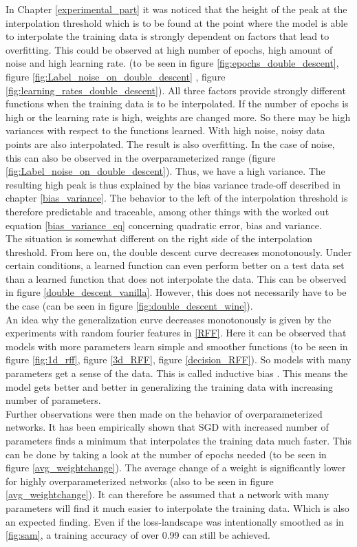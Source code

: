 In Chapter \ref{experimental_part} it was noticed that the height of the peak at the interpolation threshold which is to be found at the point where the model is able to interpolate the training data is strongly dependent on factors that lead to overfitting. This could be observed at high number of epochs, high amount of noise and high learning rate. (to be seen in figure \ref{fig:epochs_double_descent}, figure \ref{fig:Label_noise_on_double_descent} , figure \ref{fig:learning_rates_double_descent}). All three factors provide strongly different functions when the training data is to be interpolated. If the number of epochs is high or the learning rate is high, weights are changed more. So there may be high variances with respect to the functions learned. With high noise, noisy data points are also interpolated. The result is also overfitting. In the case of noise, this can also be observed in the overparameterized range (figure \ref{fig:Label_noise_on_double_descent}). Thus, we have a high variance. The resulting high peak is thus explained by the bias variance trade-off described in chapter \ref{bias_variance}. The behavior to the left of the interpolation threshold is therefore predictable and traceable, among other things with the worked out equation \ref{bias_variance_eq} concerning quadratic error, bias and variance. \\
The situation is somewhat different on the right side of the interpolation threshold. From here on, the double descent curve decreases monotonously. Under certain conditions, a learned function can even perform better on a test data set than a learned function that does not interpolate the data. This can be observed in figure \ref{double_descent_vanilla}. However, this does not necessarily have to be the case (can be seen in figure \ref{fig:double_descent_wine}). \\
An idea why the generalization curve decreases monotonously is given by the experiments with random fourier features in \ref{RFF}. Here it can be observed that models with more parameters learn simple and smoother functions (to be seen in figure \ref{fig:1d_rff}, figure \ref{3d_RFF}, figure \ref{decision_RFF}). So models with many parameters get a sense of the data. This is called inductive bias \cite{wikipedia_inductiv_bias}. This means the model gets better and better in generalizing the training data with increasing number of parameters.\\
Further observations were then made on the behavior of overparameterized networks. It has been empirically shown that SGD with increased number of parameters finds a minimum that interpolates the training data much faster. This can be done by taking a look at the number of epochs needed (to be seen in figure \ref{avg_weightchange}). The average change of a weight is significantly lower for highly overparameterized networks (also to be seen in figure \ref{avg_weightchange}). It can therefore be assumed that a network with many parameters will find it much easier to interpolate the training data. Which is also an expected finding. Even if the loss-landscape was intentionally smoothed as in \ref{fig:sam}, a training accuracy of over 0.99 can still be achieved.\\

